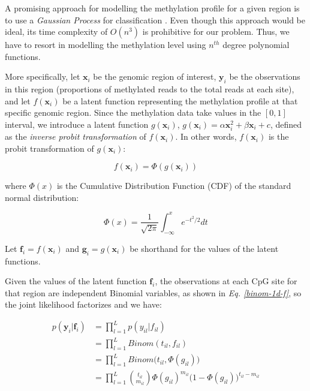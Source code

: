 A promising approach for modelling the methylation profile for a given region is to use a \emph{Gaussian Process} for classification \citep{Rasmussen2006}. Even though this approach would be ideal, its time complexity of $O(n^{3})$ is prohibitive for our problem. Thus, we have to resort in modelling the methylation level using $n^{th}$ degree polynomial functions.

More specifically, let $\mathbf{x}_{i}$ be the genomic region of interest, $\mathbf{y}_{i}$ be the observations in this region (\ie proportions of methylated reads to the total reads at each site), and let $f(\mathbf{x}_{i})$ be a latent function representing the methylation profile at that specific genomic region. Since the methylation data take values in the $[0, 1]$ interval, we introduce a latent function $g(\mathbf{x}_{i})$, \eg $g(\mathbf{x}_{i}) = \alpha \mathbf{x}_{i}^{2} + \beta \mathbf{x}_{i} + c$, defined as the \emph{inverse probit transformation} of $f(\mathbf{x}_{i})$. In other words, $f(\mathbf{x}_{i})$ is the probit transformation of $g(\mathbf{x}_{i})$:

\begin{equation} \label{probit-transform-f}
	f(\mathbf{x}_{i}) = \Phi(g(\mathbf{x}_{i}))
\end{equation}

where $\Phi(x)$ is the Cumulative Distribution Function (CDF) of the standard normal distribution:

\begin{equation} \label{cdf-stand-normal-f}
	\Phi(x) = \frac{1}{\sqrt{2\pi}} \int_{-\infty}^{x} e^{-t^{2}/2}dt
\end{equation}

Let $\mathbf{f}_{i} = f(\mathbf{x}_{i})$ and $\mathbf{g}_{i} = g(\mathbf{x}_{i})$ be shorthand for the values of the latent functions.

Given the values of the latent function $\mathbf{f}_{i}$, the observations at each CpG site for that region are independent Binomial variables, as shown in \emph{Eq. \ref{binom-1d-f}}, so the joint likelihood factorizes and we have:

\begin{equation} \label{likel-binom-prob-f}
  \begin{split}
	p(\mathbf{y}_{i}|\mathbf{f}_{i}) & = \prod_{l=1}^{L} p(y_{il}|f_{il}) \\
							 & = \prod_{l=1}^{L} Binom(t_{il}, f_{il}) \\
							 & = \prod_{l=1}^{L} Binom\big(t_{il}, \Phi(g_{il})\big) \\
							 & = \prod_{l=1}^{L} \binom{t_{il}}{m_{il}} \Phi(g_{il})^{m_{il}} (1 - \Phi(g_{il})\big)^{t_{il} - m_{il}}
  \end{split}
\end{equation}

